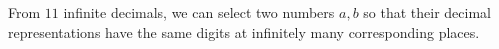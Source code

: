 From $11$ infinite decimals, we can select two numbers $a, b$ so that their decimal representations have the same digits at infinitely many corresponding places.
